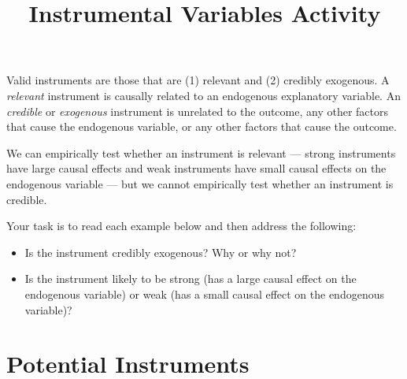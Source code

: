 \documentclass[a4paper,12pt]{article}
\title{Instrumental Variables Activity}
\author{}
\date{}
\begin{document}
	
\maketitle

\vspace{-2em}
	
\noindent Valid instruments are those that are (1) relevant and (2) credibly exogenous. A {\em relevant} instrument is causally related to an endogenous explanatory variable. An {\em credible} or {\em exogenous} instrument is unrelated to the outcome, any other factors that cause the endogenous variable, or any other factors that cause the outcome. 

\vspace{2em}
\noindent We can empirically test whether an instrument is relevant --- strong instruments have large causal effects and weak instruments have small causal effects on the endogenous variable --- but we cannot empirically test whether an instrument is credible.

\vspace{2em}
\noindent Your task is to read each example below and then address the following:
\begin{itemize}
	\item Is the instrument credibly exogenous? Why or why not?
	\item Is the instrument likely to be strong (has a large causal effect on the endogenous variable) or weak (has a small causal effect on the endogenous variable)?
\end{itemize}

\section*{Potential Instruments}
\end{document}
